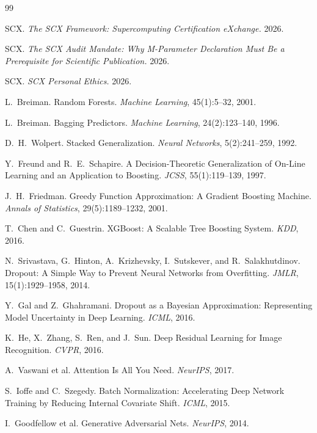 \documentclass[12pt,a4paper]{article}
\theoremstyle{definition}
\begin{document}
\begin{thebibliography}{99}

 SCX. \emph{The SCX Framework: Supercomputing Certification eXchange.} 2026.

 SCX. \emph{The SCX Audit Mandate: Why M-Parameter Declaration Must Be a Prerequisite for Scientific Publication.} 2026.

 SCX. \emph{SCX Personal Ethics.} 2026.

 L.~Breiman. Random Forests. \emph{Machine Learning}, 45(1):5--32, 2001.

 L.~Breiman. Bagging Predictors. \emph{Machine Learning}, 24(2):123--140, 1996.

 D.~H.~Wolpert. Stacked Generalization. \emph{Neural Networks}, 5(2):241--259, 1992.

 Y.~Freund and R.~E.~Schapire. A Decision-Theoretic Generalization of On-Line Learning and an Application to Boosting. \emph{JCSS}, 55(1):119--139, 1997.

 J.~H.~Friedman. Greedy Function Approximation: A Gradient Boosting Machine. \emph{Annals of Statistics}, 29(5):1189--1232, 2001.

 T.~Chen and C.~Guestrin. XGBoost: A Scalable Tree Boosting System. \emph{KDD}, 2016.

 N.~Srivastava, G.~Hinton, A.~Krizhevsky, I.~Sutskever, and R.~Salakhutdinov. Dropout: A Simple Way to Prevent Neural Networks from Overfitting. \emph{JMLR}, 15(1):1929--1958, 2014.

 Y.~Gal and Z.~Ghahramani. Dropout as a Bayesian Approximation: Representing Model Uncertainty in Deep Learning. \emph{ICML}, 2016.

 K.~He, X.~Zhang, S.~Ren, and J.~Sun. Deep Residual Learning for Image Recognition. \emph{CVPR}, 2016.

 A.~Vaswani et al. Attention Is All You Need. \emph{NeurIPS}, 2017.

 S.~Ioffe and C.~Szegedy. Batch Normalization: Accelerating Deep Network Training by Reducing Internal Covariate Shift. \emph{ICML}, 2015.

 I.~Goodfellow et al. Generative Adversarial Nets. \emph{NeurIPS}, 2014.


\end{thebibliography}
\end{document}
